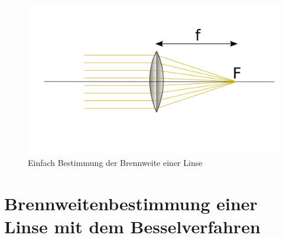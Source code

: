 \begin{figure}
    \centering
    \includegraphics{Geometrische_Optik/Protokoll/fig/Versuch1.1.png}
    \caption{Einfach Bestimmung der Brennweite einer Linse}
    \label{fig:Versuch1.1}
\end{figure}

\section{Brennweitenbestimmung einer Linse mit dem Besselverfahren}

